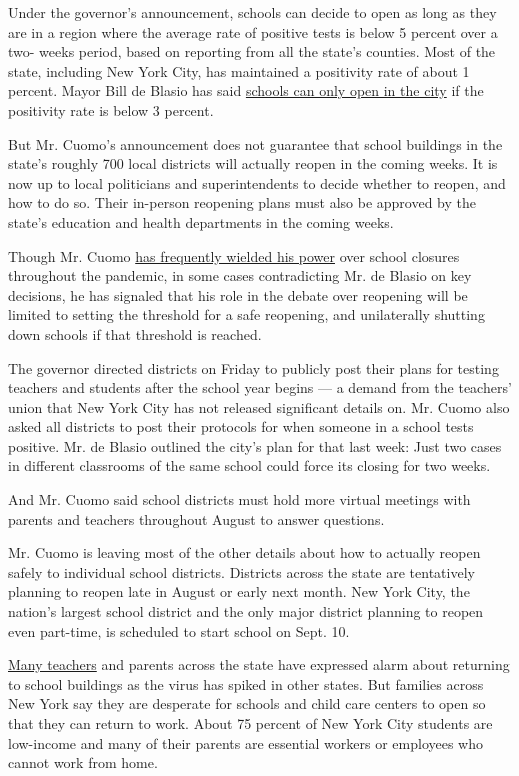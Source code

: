 Under the governor's announcement, schools can decide to open as long as
they are in a region where the average rate of positive tests is below 5
percent over a two- weeks period, based on reporting from all the
state's counties. Most of the state, including New York City, has
maintained a positivity rate of about 1 percent. Mayor Bill de Blasio
has said
\href{https://twitter.com/NYCMayor/status/1291777208953036804}{schools
can only open in the city} if the positivity rate is below 3 percent.

But Mr. Cuomo's announcement does not guarantee that school buildings in
the state's roughly 700 local districts will actually reopen in the
coming weeks. It is now up to local politicians and superintendents to
decide whether to reopen, and how to do so. Their in-person reopening
plans must also be approved by the state's education and health
departments in the coming weeks.

Though Mr. Cuomo
\href{https://www.nytimes3xbfgragh.onion/2020/04/12/nyregion/schools-cuomo-de-blasio-nyc-coronavirus.html}{has
frequently wielded his power} over school closures throughout the
pandemic, in some cases contradicting Mr. de Blasio on key decisions, he
has signaled that his role in the debate over reopening will be limited
to setting the threshold for a safe reopening, and unilaterally shutting
down schools if that threshold is reached.

The governor directed districts on Friday to publicly post their plans
for testing teachers and students after the school year begins --- a
demand from the teachers' union that New York City has not released
significant details on. Mr. Cuomo also asked all districts to post their
protocols for when someone in a school tests positive. Mr. de Blasio
outlined the city's plan for that last week: Just two cases in different
classrooms of the same school could force its closing for two weeks.

And Mr. Cuomo said school districts must hold more virtual meetings with
parents and teachers throughout August to answer questions.

Mr. Cuomo is leaving most of the other details about how to actually
reopen safely to individual school districts. Districts across the state
are tentatively planning to reopen late in August or early next month.
New York City, the nation's largest school district and the only major
district planning to reopen even part-time, is scheduled to start school
on Sept. 10.

\href{https://www.nytimes3xbfgragh.onion/2020/07/29/us/teacher-union-school-reopening-coronavirus.html}{Many
teachers} and parents across the state have expressed alarm about
returning to school buildings as the virus has spiked in other states.
But families across New York say they are desperate for schools and
child care centers to open so that they can return to work. About 75
percent of New York City students are low-income and many of their
parents are essential workers or employees who cannot work from home.

